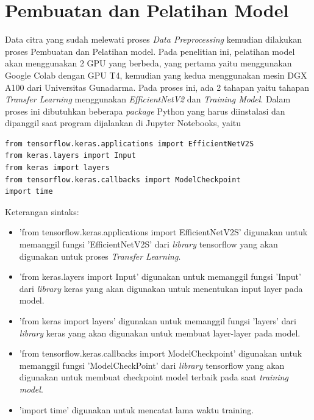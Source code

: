 \section{Pembuatan dan Pelatihan Model}
Data citra yang sudah melewati proses \textit{Data Preprocessing} kemudian dilakukan proses Pembuatan dan Pelatihan model. Pada penelitian ini, pelatihan model akan menggunakan 2 GPU yang berbeda, yang pertama yaitu menggunakan Google Colab dengan GPU T4, kemudian yang kedua menggunakan mesin DGX A100 dari Universitas Gunadarma. Pada proses ini, ada 2 tahapan yaitu tahapan \textit{Transfer Learning} menggunakan \textit{EfficientNetV2} dan \textit{Training Model}. Dalam proses ini dibutuhkan beberapa \textit{package} Python yang harus diinstalasi dan dipanggil saat program dijalankan di Jupyter Notebooks, yaitu

\begin{lstlisting}[style=customc]
from tensorflow.keras.applications import EfficientNetV2S
from keras.layers import Input
from keras import layers
from tensorflow.keras.callbacks import ModelCheckpoint
import time
\end{lstlisting}

Keterangan sintaks:
\begin{itemize}
    \item 'from tensorflow.keras.applications import EfficientNetV2S' digunakan untuk memanggil fungsi 'EfficientNetV2S' dari \textit{library} tensorflow yang akan digunakan untuk proses \textit{Transfer Learning}.
    \item 'from keras.layers import Input' digunakan untuk memanggil fungsi 'Input' dari \textit{library} keras yang akan digunakan untuk menentukan input layer pada model.
    \item 'from keras import layers' digunakan untuk memanggil fungsi 'layers' dari \textit{library} keras yang akan digunakan untuk membuat layer-layer pada model.
    \item 'from tensorflow.keras.callbacks import ModelCheckpoint' digunakan untuk memanggil fungsi 'ModelCheckPoint' dari \textit{library} tensorflow yang akan digunakan untuk membuat checkpoint model terbaik pada saat \textit{training model}.
    \item 'import time' digunakan untuk mencatat lama waktu training.
\end{itemize}

